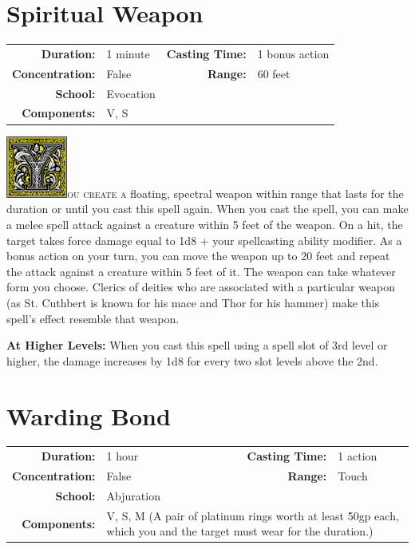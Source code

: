 \documentclass[12pt,showtrims]{memoir}
\begin{document}
\section*{Spiritual Weapon}

{
\small\centering\vspace{-6pt}
\begin{tabular}{rlrl}
\toprule

\textbf{Duration:} & 1 minute &
\textbf{Casting Time:} & 1 bonus action \\
\textbf{Concentration:} & False &
\textbf{Range:} & 60 feet \\
\textbf{School:} & Evocation \\
\textbf{Components:} & \multicolumn{3}{p{0.7\textwidth}}{V, S}\\

\bottomrule
\end{tabular}
}

\vspace{1\baselineskip}\noindent 
\lettrine[lines=4]{\includegraphics[height=58pt]{initials/Y.png}}{ou create a} floating, spectral weapon within range that lasts for the duration or until you cast this spell again. When you cast the spell, you can make a melee spell attack against a creature within 5 feet of the weapon. On a hit, the target takes force damage equal to 1d8 + your spellcasting ability modifier. As a bonus action on your turn, you can move the weapon up to 20 feet and repeat the attack against a creature within 5 feet of it. The weapon can take whatever form you choose. Clerics of deities who are associated with a particular weapon (as St. Cuthbert is known for his mace and Thor for his hammer) make this spell's effect resemble that weapon.

\vspace{8pt} \noindent\textbf{At Higher Levels:} When you cast this spell using a spell slot of 3rd level or higher, the damage increases by 1d8 for every two slot levels above the 2nd.
\newpage
\section*{Warding Bond}

{
\small\centering\vspace{-6pt}
\begin{tabular}{rlrl}
\toprule

\textbf{Duration:} & 1 hour &
\textbf{Casting Time:} & 1 action \\
\textbf{Concentration:} & False &
\textbf{Range:} & Touch \\
\textbf{School:} & Abjuration \\
\textbf{Components:} & \multicolumn{3}{p{0.7\textwidth}}{V, S, M (A pair of platinum rings worth at least 50gp each, which you and the target must wear for the duration.)}\\

\bottomrule
\end{tabular}
}
\end{document}
